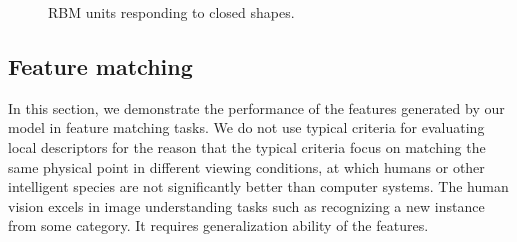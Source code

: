 \documentclass[twocolumn]{article}
\begin{document}
\begin{figure}[!t]
\centering
{}\hfil
{}\hfil
{}
\caption{RBM units responding to closed shapes.}
\label{fig:10}
\end{figure}

\subsection{Feature matching}

In this section, we demonstrate the performance of the features generated by our model in feature matching tasks.
We do not use typical criteria for evaluating local descriptors \cite{mikolajczyk2005}
for the reason that the typical criteria focus on matching the same physical point in different viewing conditions,
at which humans or other intelligent species are not significantly better than computer systems.
The human vision excels in image understanding tasks such as recognizing a new instance from some category.
It requires generalization ability of the features.
\end{document}
